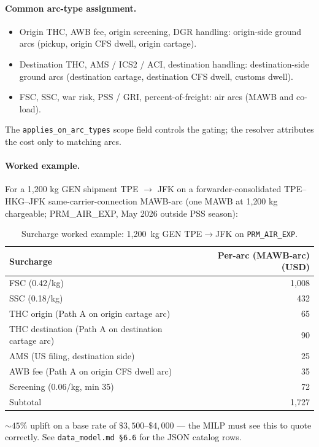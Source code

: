 \documentclass[11pt,a4paper]{article}
\theoremstyle{definition}
\begin{document}
\paragraph{Common arc-type assignment.}
\begin{itemize}[noitemsep]
  \item Origin THC, AWB fee, origin screening, DGR handling: origin-side
        ground arcs (pickup, origin CFS dwell, origin cartage).
  \item Destination THC, AMS / ICS2 / ACI, destination handling: destination-side
        ground arcs (destination cartage, destination CFS dwell, customs
        dwell).
  \item FSC, SSC, war risk, PSS / GRI, percent-of-freight: air arcs (MAWB and
        co-load).
\end{itemize}
The \texttt{applies\_on\_arc\_types} scope field controls the gating; the
resolver attributes the cost only to matching arcs.

\paragraph{Worked example.}
For a 1{,}200 kg GEN shipment TPE $\to$ JFK on a forwarder-consolidated
TPE--HKG--JFK same-carrier-connection MAWB-arc (one MAWB at 1{,}200 kg
chargeable; PRM\_AIR\_EXP, May 2026 outside PSS season):
\begin{table}[H]
\centering
\caption{Surcharge worked example: 1{,}200~kg GEN TPE$\to$JFK on \texttt{PRM\_AIR\_EXP}.}
\label{tab:surcharge-example}
\begin{tabular}{lr}
\toprule
Surcharge & Per-arc (MAWB-arc) (USD) \\
\midrule
FSC (0.42/kg) & 1{,}008 \\
SSC (0.18/kg) & 432 \\
THC origin (Path A on origin cartage arc) & 65 \\
THC destination (Path A on destination cartage arc) & 90 \\
AMS (US filing, destination side) & 25 \\
AWB fee (Path A on origin CFS dwell arc) & 35 \\
Screening (0.06/kg, min 35) & 72 \\
\midrule
Subtotal & 1{,}727 \\
\bottomrule
\end{tabular}
\end{table}
$\sim 45\%$ uplift on a base rate of $\$3{,}500$--$\$4{,}000$ --- the MILP
must see this to quote correctly. See \texttt{data\_model.md \S6.6} for the
JSON catalog rows.
\end{document}
